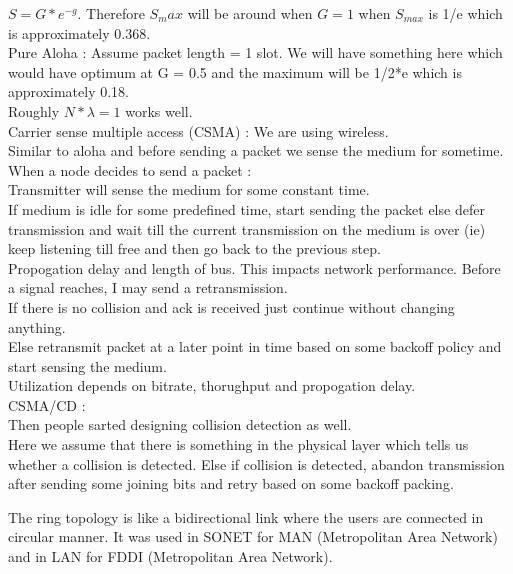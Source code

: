 \documentclass[solution,addpoints,12pt]{exam}
\begin{document}
\begin{itemize}
$S = G*e^{-g}$. Therefore $S_max$ will be around when $G = 1$ when $S_{max}$ is
1/e which is approximately 0.368.\\
Pure Aloha : Assume packet length = 1 slot. We will have something
here which would have optimum at G = 0.5 and the maximum will be 1/2*e which
is approximately 0.18.\\

Roughly $N*\lambda = 1$ works well.\\
Carrier sense multiple access (CSMA) : We are using wireless.\\

Similar to aloha and before sending a packet we sense the medium for
sometime.\\
When a node decides to send a packet :\\
Transmitter will sense the medium for some constant time.\\
If medium is idle for some predefined time, start sending the packet
else defer transmission and wait till the current transmission on the
medium is over (ie) keep listening till free and then go back to the
previous step.\\

Propogation delay and length of bus. This impacts network
performance. Before a signal reaches, I may send a retransmission.\\

If there is no collision and ack is received just continue
without changing anything.\\

Else retransmit packet at a later point in time based on some
backoff policy and start sensing the medium.\\

Utilization depends on bitrate, thorughput and propogation delay.\\

CSMA/CD :\\
Then people sarted designing collision detection as well.\\
Here we assume that there is something in the physical layer which
tells us whether a collision is detected. Else if collision
is detected, abandon transmission after sending some joining bits
and retry based on some backoff packing.

\end{itemize}

The ring topology is like a bidirectional link
where the users are connected in circular manner.
It was used in SONET for MAN (Metropolitan Area Network)
and in LAN for FDDI (Metropolitan Area Network).\\
\end{document}
